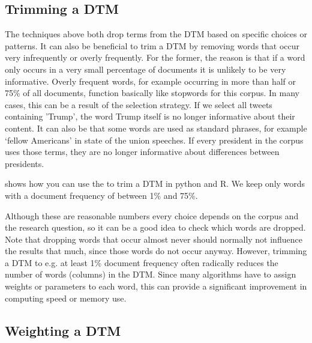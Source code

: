  

\subsection{Trimming a DTM}

The techniques above both drop terms from the DTM based on specific choices or patterns.
It can also be beneficial to trim a DTM by removing words that occur very infrequently or overly frequently.
For the former, the reason is that if a word only occurs in a very small percentage of documents it is unlikely to be very informative.
Overly frequent words, for example occurring in more than half or 75\% of all documents, function basically like stopwords for this corpus.
In many cases, this can be a result of the selection strategy. If we select all tweets containing 'Trump', the word Trump itself is no longer informative about their content.
It can also be that some words are used as standard phrases, for example `fellow Americans' in state of the union speeches.
If every president in the corpus uses those terms, they are no longer informative about differences between presidents.


 shows how you can use the  to trim a DTM in python and R.
We keep only words with a document frequency of between 1\% and 75\%.

Although these are reasonable numbers every choice depends on the corpus and the research question, so it can be a good idea to check which words are dropped.
Note that dropping words that occur almost never should normally not influence the results that much, since those words do not occur anyway.
However, trimming a DTM to e.g. at least 1\% document frequency often radically reduces the number of words (columns) in the DTM.
Since many algorithms have to assign weights or parameters to each word, this can provide a significant improvement in computing speed or memory use. 

\subsection{Weighting a DTM}

